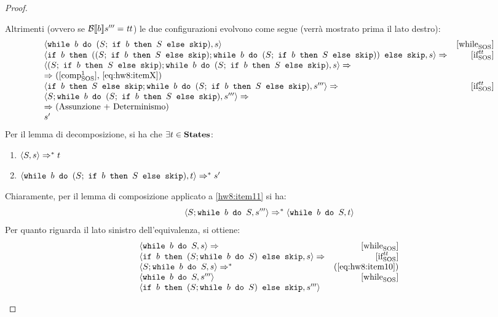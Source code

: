 \begin{proof}
\begin{itemize}
  Altrimenti (ovvero se $\B{b}''' = \semtrue$) le due configurazioni evolvono
  come segue (verrà mostrato prima il lato destro):
  $$
  \begin{array}{lr}
  \confSs{\wbS{b}{(S;\ \ifABC{b}{S}{\skipForFriends})}}{s} & \whileSOS \\
  \confSs{\ifABC{b}
            {((S;\ \ifABC{b}{S}{\skipForFriends});
              \wbS{b}{(S;\ \ifABC{b}{S}{\skipForFriends})})}
            {\skipForFriends}
         }{s} \Rar{ }& \ifttSOS \\
  \confSs{  (S;\ \ifABC{b}{S}{\skipForFriends});
            \wbS{b}{(S;\ \ifABC{b}{S}{\skipForFriends})}
         }{s} \Rar{ } \\
  \Rar{ } (\text{$\compoSOS$, \ref{eq:hw8:itemX}})\\
  \confSs{  \ifABC{b}{S}{\skipForFriends};
            \wbS{b}{(S;\ \ifABC{b}{S}{\skipForFriends})}
         }{s'''} \Rar{ } & \ifttSOS \\
  \confSs{  S;
            \wbS{b}{(S;\ \ifABC{b}{S}{\skipForFriends})}
         }{s'''} \Rar{ } \\
  \Rar{ } (\text{Assunzione + Determinismo})\\
  s'
  \end{array}
  $$
  Per il lemma di decomposizione, si ha che $\exists{t}\in\states$:
  \begin{enumerate}[label=(\alph*)]
    \item $\confSs{S}{s} \Rar{*} t$
    \label{hw8:item11}
    \item $\confSs{\wbS{b}{(S;\ \ifABC{b}{S}{\skipForFriends})}}{t} \Rar{*} s'$
    \label{hw8:item12}
  \end{enumerate}
  Chiaramente, per il lemma di composizione applicato a \ref{hw8:item11} si ha:
  \begin{equation}
  \langle{}S; \mbox{\normalfont{\texttt{while }}} b \textrm{\normalfont{\texttt{ do }}} S, s'''\rangle{} \Rightarrow^{*} \langle{}\mbox{\normalfont{\texttt{while }}} b \textrm{\normalfont{\texttt{ do }}} S, t\rangle{}
  \label{eq:hw8:item13}
  \end{equation}
  Per quanto riguarda il lato sinistro dell'equivalenza, si ottiene:
  $$
  \begin{array}{lr}
  \confSs{\wbS{b}{S}}{s} \Rar{ }  & \whileSOS \\
  \confSs{\ifABC{b}{(S;\wbS{b}{S})}{\skipForFriends}}{s} \Rar{ } & \ifttSOS\\
  \confSs{S; \wbS{b}{S}}{s} \Rar{*} & (\text{\ref{eq:hw8:item10}})\\
  \confSs{\wbS{b}{S}}{s'''}  & \whileSOS \\
  \confSs{\ifABC{b}{(S;\wbS{b}{S})}{\skipForFriends}}{s'''}

\end{array}$$
\end{itemize}
\end{proof}
